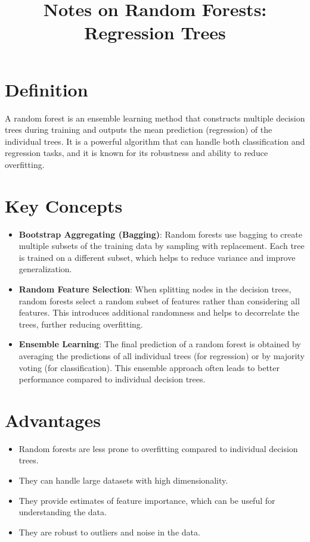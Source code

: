 \documentclass[conference]{IEEEtran}
\title{Notes on Random Forests: Regression Trees}
\author{
\IEEEauthorblockN{Luis Mendez}
}
\begin{document}
\maketitle

\section*{Definition}
A random forest is an ensemble learning method that constructs multiple decision trees during training and outputs the mean prediction (regression) of the individual trees. It is a powerful algorithm that can handle both classification and regression tasks, and it is known for its robustness and ability to reduce overfitting.

\section*{Key Concepts}
\begin{itemize}
    \item \textbf{Bootstrap Aggregating (Bagging)}: Random forests use bagging to create multiple subsets of the training data by sampling with replacement. Each tree is trained on a different subset, which helps to reduce variance and improve generalization.
    
    \item \textbf{Random Feature Selection}: When splitting nodes in the decision trees, random forests select a random subset of features rather than considering all features. This introduces additional randomness and helps to decorrelate the trees, further reducing overfitting.
    
    \item \textbf{Ensemble Learning}: The final prediction of a random forest is obtained by averaging the predictions of all individual trees (for regression) or by majority voting (for classification). This ensemble approach often leads to better performance compared to individual decision trees.
\end{itemize}

\section*{Advantages}
\begin{itemize}
    \item Random forests are less prone to overfitting compared to individual decision trees.
    \item They can handle large datasets with high dimensionality.
    \item They provide estimates of feature importance, which can be useful for understanding the data.
    \item They are robust to outliers and noise in the data.
\end{itemize}
\end{document}
